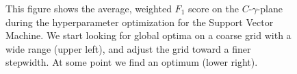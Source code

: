 \begin{figure}[H]
\hfill
{}
\hfill
{}
\hfill
\caption[Hyperparameter optimization for the Support Vector Machine (SVM)]{This figure shows the average, weighted $F_1$ score on the $C$-$\gamma$-plane during the hyperparameter optimization for the Support Vector Machine. We start looking for global optima on a coarse grid with a wide range (upper left), and adjust the grid toward a finer stepwidth. At some point we find an optimum (lower right).}
\label{fig:gridsearch-svm-superclasses}
\end{figure}


